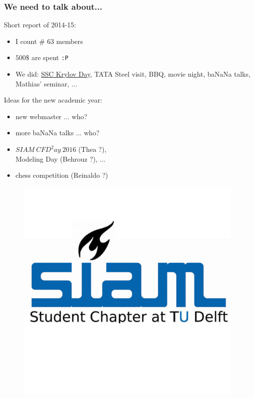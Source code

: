 \documentclass{beamer}
\begin{document}
\begin{frame}
\frametitle{We need to talk about...}
\vspace{0.5cm}
Short report of 2014-15:
\begin{itemize}
 \item I count \# 63 members
 \item $500 \$$ are spent \texttt{:P}
 \item We did: \href{http://sinews.siam.org/DetailsPage/tabid/607/ArticleID/504/European-Students-Gather-at-TU-Delft-for-Krylov-Day.aspx}{SSC Krylov Day}, TATA Steel visit, BBQ, movie night, baNaNa talks, Mathias' seminar, ...
\end{itemize}

Ideas for the new academic year:
\begin{itemize}
 \item new webmaster ... who{\color{red}?}
 \item more baNaNa talks ... who{\color{red}?}
 \item $SIAM \ CFD^2ay \ 2016$ (Thea {\color{red}?}), \\ Modeling Day (Behrouz {\color{red}?}), ...
 \item chess competition (Reinaldo {\color{red}?})
\end{itemize}
 \vspace{-3cm}
 \begin{figure}
 \hfill
 \includegraphics[height=0.3\textheight]{images/SIAMSC_Delft}
\end{figure}
\end{frame}
\end{document}
